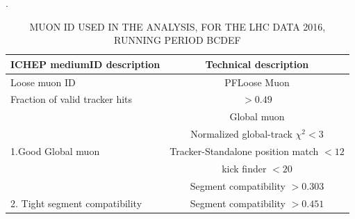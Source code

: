 \begin{table}[!tpb]
\caption{MUON ID USED IN THE ANALYSIS, FOR THE LHC DATA 2016, RUNNING PERIOD BCDEF  }
\label{tbl:ICHEPMedID}. 
\begin{center}
\begin{tabular}{|l|c|}   
\hline
ICHEP mediumID description                    &  Technical description\\\hline
Loose muon ID                               & PFLoose Muon\\\hline
Fraction of valid tracker hits           & $>0.49$ \\\hline
\multirow{5}{*}{1.Good Global muon}                      &Global muon\\\cline{2-2}
                                                                        &Normalized global-track $\chi^{2}<3$\\\cline{2-2}
                                                                        &Tracker-Standalone position match $< 12$\\\cline{2-2}
                                                                        &kick finder $< 20$ \\\cline{2-2}
                                                                        &Segment compatibility $> 0.303$ \\\hline                                                                       
\hline
2. Tight segment compatibility      & Segment compatibility $>0.451$\\\hline
\end{tabular}
\end{center}
\end{table}



